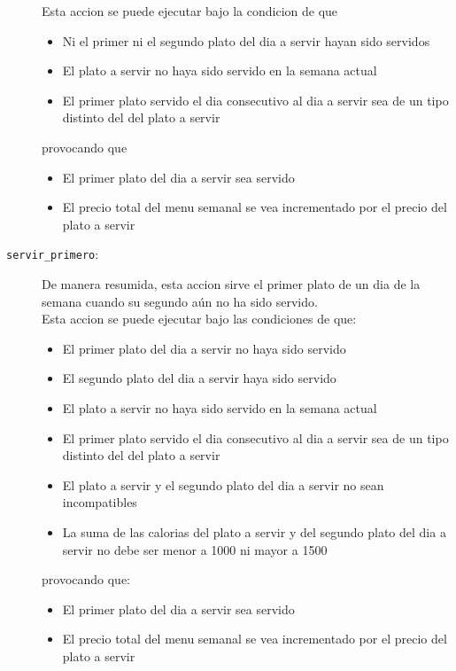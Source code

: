\begin{description}
    Esta accion se puede ejecutar
    bajo la condicion de que
    \begin{itemize}
      \item Ni el primer ni el segundo plato del dia a servir hayan sido
        servidos
      \item El plato a servir no haya sido servido en la semana actual
      \item El primer plato servido el dia consecutivo al dia a servir sea de
        un tipo distinto del del plato a servir
    \end{itemize}
    provocando que
    \begin{itemize}
      \item El primer plato del dia a servir sea servido
      \item El precio total del menu semanal se vea incrementado por el precio 
        del plato a servir
    \end{itemize}

  \item[\texttt{servir\_primero}:]

    De manera resumida, esta accion
    sirve el primer plato de un dia de la semana cuando su segundo
    aún no ha sido servido.
    \\

    Esta accion se puede ejecutar
    bajo las condiciones de que:
    \begin{itemize}
      \item El primer plato del dia a servir no haya sido servido
      \item El segundo plato del dia a servir haya sido servido
      \item El plato a servir no haya sido servido en la semana actual
      \item El primer plato servido el dia consecutivo al dia a servir sea de
        un tipo distinto del del plato a servir
      \item El plato a servir y el segundo plato del dia a servir no sean
        incompatibles
      \item La suma de las calorias del plato a servir y del segundo plato
        del dia a servir no debe ser menor a 1000 ni mayor a 1500
    \end{itemize}
    provocando que:
    \begin{itemize}
      \item El primer plato del dia a servir sea servido
      \item El precio total del menu semanal se vea incrementado por el precio 
        del plato a servir
    \end{itemize}


\end{description}
